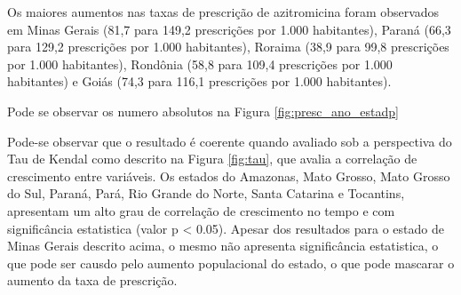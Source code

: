     Os maiores aumentos nas taxas de prescrição de azitromicina foram observados em Minas Gerais (81,7 para 149,2 prescrições por 1.000 habitantes), Paraná (66,3 para 129,2 prescrições por 1.000 habitantes), Roraima (38,9 para 99,8 prescrições por 1.000 habitantes), Rondônia (58,8 para 109,4 prescrições por 1.000 habitantes) e Goiás (74,3 para 116,1 prescrições por 1.000 habitantes). 

    Pode se observar os numero absolutos na Figura \ref{fig:presc_ano_estadp}


    Pode-se observar que o resultado é coerente quando avaliado sob a perspectiva do Tau de Kendal como descrito na Figura \ref{fig:tau}, que avalia a correlação de crescimento entre variáveis. Os estados do Amazonas, Mato Grosso, Mato Grosso do Sul, Paraná, Pará, Rio Grande do Norte, Santa Catarina e Tocantins, apresentam um alto grau de correlação de crescimento no tempo e com significância estatistica (valor p < 0.05). Apesar dos resultados para o estado de Minas Gerais descrito acima, o mesmo não apresenta significância estatistica, o que pode ser causdo pelo aumento populacional do estado, o que pode mascarar o aumento da taxa de prescrição.

